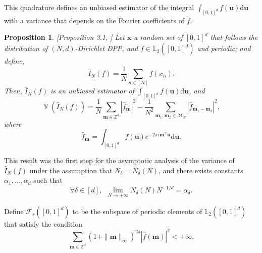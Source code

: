 \documentclass[twoside,11pt]{book}
\newtheorem{proposition}{Proposition}
\DeclareMathOperator{\Tran}{\intercal}
\DeclareMathOperator{\Var}{\mathbb{V}}
\begin{document}
This quadrature defines an unbiased estimator of the integral $\int_{[0,1]^{d}} f(\bm{u}) \mathrm{d}\bm{u}$ with a variance that depends on the Fourier coefficients of $f$. 
\begin{proposition}\label{prop:dirichlet_estimator} [Proposition 3.1, \citep{CoMaAm20} ]
Let $\bm{x}$ a random set of $[0,1]^{d}$ that follows the distribution of $(N,d)$-Dirichlet DPP, and $f \in \mathbb{L}_{2}([0,1]^{d})$ and periodic; and define, 
\begin{equation}
\hat{I}_{N}(f) =  \frac{1}{N} \sum\limits_{n \in [N]}f(x_{n}).
\end{equation}
Then, $\hat{I}_{N}(f)$ is an unbiased estimator of $\displaystyle \int_{[0,1]^{d}} f(\bm{u})\mathrm{d}\bm{u}$, and
\begin{equation}
\Var (\hat{I}_{N}(f)) = \frac{1}{N}\sum\limits_{\bm{m} \in \mathbb{Z}^{d}} |\hat{f}_{\bm{m}}|^{2} - \frac{1}{N^2} \sum\limits_{\bm{m}_{1},\bm{m}_{2} \in \mathcal{M}_{N}} |\hat{f}_{\bm{m}_{1}-\bm{m}_{2}}|^{2},
\end{equation}
where
\begin{equation}
 \hat{f}_{\bm{m}} = \int_{[0,1]^{d}}f(\bm{u}) e^{- 2\pi i \bm{m}^{\Tran}\bm{u}} \mathrm{d}\bm{u}.
\end{equation}


\end{proposition}


This result was the first step for the asymptotic analysis of the variance of $\hat{I}_{N}(f)$ under the assumption that $N_{\delta} = N_{\delta}(N)$, and there exists constants $\alpha_{1}, \dots, \alpha_{d}$ such that
\begin{equation}
\forall \delta \in [d], \:\:\lim\limits_{N \rightarrow +\infty} N_{\delta}(N)N^{-1/d} = \alpha_{\delta}.
\end{equation}

Define $\mathcal{F}_{s}([0,1]^{d})$ to be the subspace of periodic elements of $\mathbb{L}_{2}([0,1]^{d})$ that satisfy the condition
\begin{equation}
\sum\limits_{\bm{m} \in \mathbb{Z}^{d}} (1+ \|\bm{m}\|_{\infty})^{2s} |\hat{f}(\bm{m})|^{2} < +\infty.
\end{equation}
\end{document}
